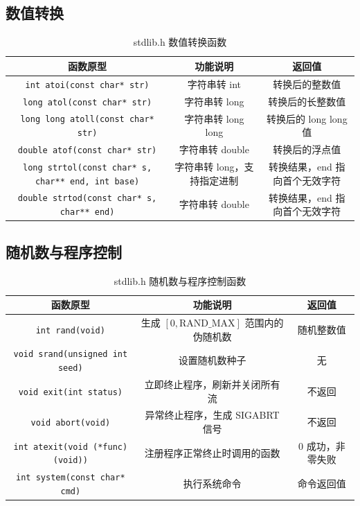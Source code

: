\subsection{数值转换}

\begin{table}[H]
\centering
\small
\renewcommand{\arraystretch}{1.6}
\begin{tabulary}{\linewidth}{CCC}
\toprule
\textbf{函数原型} & \textbf{功能说明} & \textbf{返回值} \\ \midrule
\texttt{int atoi(const char* str)} & 字符串转 int & 转换后的整数值 \\ 
\texttt{long atol(const char* str)} & 字符串转 long & 转换后的长整数值 \\ 
\texttt{long long atoll(const char* str)} & 字符串转 long long & 转换后的 long long 值 \\ 
\texttt{double atof(const char* str)} & 字符串转 double & 转换后的浮点值 \\ 
\texttt{long strtol(const char* s, char** end, int base)} & 字符串转 long，支持指定进制 & 转换结果，end 指向首个无效字符 \\ 
\texttt{double strtod(const char* s, char** end)} & 字符串转 double & 转换结果，end 指向首个无效字符 \\ \bottomrule
\end{tabulary}
\caption{stdlib.h 数值转换函数}
\label{tab:stdlib_conv}
\end{table}

\subsection{随机数与程序控制}

\begin{table}[H]
\centering
\small
\renewcommand{\arraystretch}{1.6}
\begin{tabulary}{\linewidth}{CCC}
\toprule
\textbf{函数原型} & \textbf{功能说明} & \textbf{返回值} \\ \midrule
\texttt{int rand(void)} & 生成 $[0, \text{RAND\_MAX}]$ 范围内的伪随机数 & 随机整数值 \\ 
\texttt{void srand(unsigned int seed)} & 设置随机数种子 & 无 \\ 
\texttt{void exit(int status)} & 立即终止程序，刷新并关闭所有流 & 不返回 \\ 
\texttt{void abort(void)} & 异常终止程序，生成 SIGABRT 信号 & 不返回 \\ 
\texttt{int atexit(void (*func)(void))} & 注册程序正常终止时调用的函数 & 0 成功，非零失败 \\ 
\texttt{int system(const char* cmd)} & 执行系统命令 & 命令返回值 \\ \bottomrule
\end{tabulary}
\caption{stdlib.h 随机数与程序控制函数}
\label{tab:stdlib_ctrl}
\end{table}

